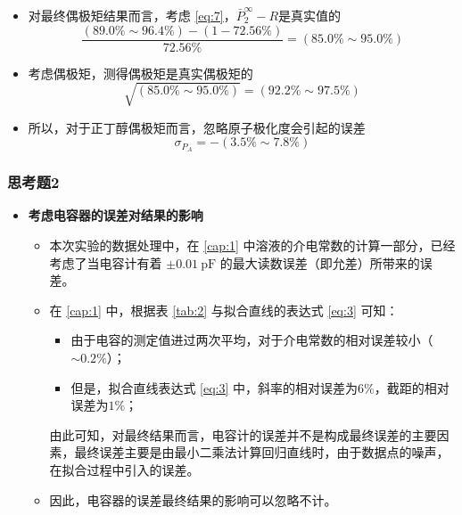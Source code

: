 \documentclass[cn,hazy,pku,12pt,normal,math=newtx,cite=super]{elegantnote}
\begin{document}
\begin{enumerate}
\begin{itemize}
        \item 对最终偶极矩结果而言，考虑 \eqref{eq:7}，$\bar{P}_2^\infty - R$是真实值的
        \begin{equation*}
            \frac{(89.0\%\sim 96.4\%)-(1-72.56\%)}{72.56\%} = (85.0\%\sim 95.0\%)
        \end{equation*}
        \item 考虑偶极矩，测得偶极矩是真实偶极矩的
        \begin{equation*}
            \sqrt{(85.0\%\sim 95.0\%)} = (92.2\%\sim 97.5\%)
        \end{equation*}
        \item 所以，对于正丁醇偶极矩而言，忽略原子极化度会引起的误差
        \begin{equation*}
            \sigma_{P_A} = -(3.5\%\sim7.8\%)
        \end{equation*}
    \end{itemize}
\end{enumerate}

\subsubsection{思考题2}

\begin{itemize}
    \item \textbf{考虑电容器的误差对结果的影响}
    \begin{itemize}
        \item 本次实验的数据处理中，在 \ref{cap:1} 中溶液的介电常数的计算一部分，已经考虑了当电容计有着 $\pm 0.01\mathrm{~pF}$ 的最大读数误差（即允差）所带来的误差。
        \item 在 \ref{cap:1} 中，根据表 \ref{tab:2} 与拟合直线的表达式 \eqref{eq:3} 可知：
        \begin{itemize}
            \item 由于电容的测定值进过两次平均，对于介电常数的相对误差较小（$\sim 0.2\%$）；
            \item 但是，拟合直线表达式 \eqref{eq:3} 中，斜率的相对误差为$6\%$，截距的相对误差为$1\%$；
        \end{itemize}
        由此可知，对最终结果而言，电容计的误差并不是构成最终误差的主要因素，最终误差主要是由最小二乘法计算回归直线时，由于数据点的噪声，在拟合过程中引入的误差。
        \item 因此，电容器的误差最终结果的影响可以忽略不计。
    \end{itemize}
\end{itemize}
\end{document}
